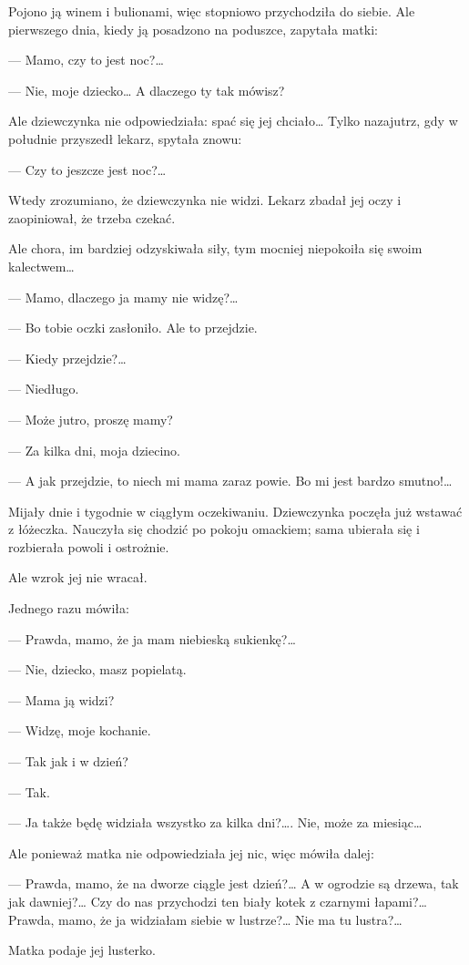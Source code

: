 Pojono ją winem i bulionami, więc stopniowo przychodziła do
siebie. Ale pierwszego dnia, kiedy ją posadzono na poduszce, zapytała
matki:

— Mamo, czy to jest noc?…

— Nie, moje dziecko… A dlaczego ty tak mówisz?

Ale dziewczynka nie odpowiedziała: spać się jej chciało… Tylko
nazajutrz, gdy w południe przyszedł lekarz, spytała znowu:

— Czy to jeszcze jest noc?…

Wtedy zrozumiano, że dziewczynka nie widzi. Lekarz zbadał jej oczy i
zaopiniował, że trzeba czekać.

Ale chora, im bardziej odzyskiwała siły, tym mocniej niepokoiła się
swoim kalectwem…

— Mamo, dlaczego ja mamy nie widzę?…

— Bo tobie oczki zasłoniło. Ale to przejdzie.

— Kiedy przejdzie?…

— Niedługo.

— Może jutro, proszę mamy?

— Za kilka dni, moja dziecino.

— A jak przejdzie, to niech mi mama zaraz powie. Bo mi jest bardzo
smutno!…

Mijały dnie i tygodnie w ciągłym oczekiwaniu. Dziewczynka poczęła już
wstawać z łóżeczka. Nauczyła się chodzić po pokoju omackiem; sama
ubierała się i rozbierała powoli i ostrożnie.

Ale wzrok jej nie wracał.

Jednego razu mówiła:

— Prawda, mamo, że ja mam niebieską sukienkę?…

— Nie, dziecko, masz popielatą.

— Mama ją widzi?

— Widzę, moje kochanie.

— Tak jak i w dzień?

— Tak.

— Ja także będę widziała wszystko za kilka dni?…. Nie, może za
miesiąc…

Ale ponieważ matka nie odpowiedziała jej nic, więc mówiła dalej:

— Prawda, mamo, że na dworze ciągle jest dzień?… A w ogrodzie są
drzewa, tak jak dawniej?… Czy do nas przychodzi ten biały kotek z
czarnymi łapami?… Prawda, mamo, że ja widziałam siebie w lustrze?… Nie
ma tu lustra?…

Matka podaje jej lusterko.

